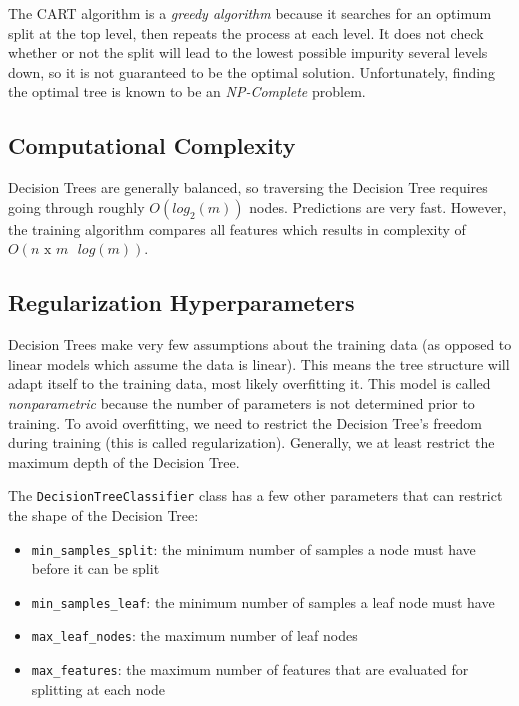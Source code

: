\documentclass[letterpaper]{article}
\begin{document}
The CART algorithm is a \textsl{greedy algorithm} because it searches for an optimum split at the top level, then repeats the process at each level. It does not check whether or not the split will lead to the lowest possible impurity several levels down, so it is not guaranteed to be the optimal solution. Unfortunately, finding the optimal tree is known to be an \textsl{NP-Complete} problem. 

\subsection{Computational Complexity}
Decision Trees are generally balanced, so traversing the Decision Tree requires going through roughly $O(log_{2}(m))$ nodes. Predictions are very fast. However, the training algorithm compares all features which results in complexity of $O(n \text{ x } m \text{ } log(m))$.  

\subsection{Regularization Hyperparameters}
Decision Trees make very few assumptions about the training data (as opposed to linear models which assume the data is linear). This means the tree structure will adapt itself to the training data, most likely overfitting it. This model is called \textsl{nonparametric} because the number of parameters is not determined prior to training. To avoid overfitting, we need to restrict the Decision Tree's freedom during training (this is called regularization). Generally, we at least restrict the maximum depth of the Decision Tree. 

The \texttt{DecisionTreeClassifier} class has a few other parameters that can restrict the shape of the Decision Tree: 

\begin{itemize}
	\item \texttt{min\_samples\_split}: the minimum number of samples a node must have before it can be split 
	\item \texttt{min\_samples\_leaf}: the minimum number of samples a leaf node must have 
	\item \texttt{max\_leaf\_nodes}: the maximum number of leaf nodes 
	\item \texttt{max\_features}: the maximum number of features that are evaluated for splitting at each node 

\end{itemize}
\end{document}
